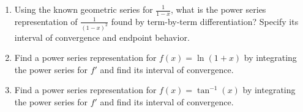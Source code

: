 \begin{enumerate}
\item Using the known geometric series for \(\frac{1}{1-x}\), what is the power series representation of \(\frac{1}{(1-x)^2}\) found by term-by-term differentiation? Specify its interval of convergence and endpoint behavior.

\item Find a power series representation for \(f(x)=\ln(1+x)\) by integrating the power series for $f'$ and find its interval of convergence.

\item Find a power series representation for \(f(x)=\tan^{-1}(x)\) by integrating the power series for $f'$ and find its interval of convergence.

\end{enumerate}

